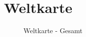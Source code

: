 \chapter{Weltkarte}
\begin{figure}[hbtp]
\caption{Weltkarte - Gesamt}
\label{worldmap}
\end{figure}
